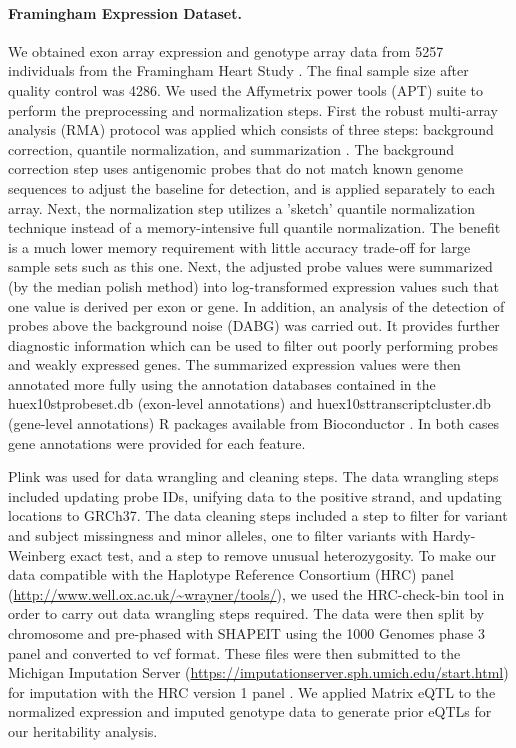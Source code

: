 \documentclass[10pt,letterpaper]{article}
\begin{document}
\paragraph*{Framingham Expression Dataset.}\label{framingham-dataset}

We obtained exon array expression and genotype array data from 5257 individuals from the Framingham Heart Study \cite{Zhang_2015}. The final sample size after quality control was 4286. We used the Affymetrix power tools (APT) suite to perform the preprocessing and normalization steps. First the robust multi-array analysis (RMA) protocol was applied which consists of three steps: background correction, quantile normalization, and summarization \cite{irizarry2003summaries}. The background correction step uses antigenomic probes that do not match known genome sequences to adjust the baseline for detection, and is applied separately to each array. Next, the normalization step utilizes a 'sketch' quantile normalization technique instead of a memory-intensive full quantile normalization. The benefit is a much lower memory requirement with little accuracy trade-off for large sample sets such as this one. Next, the adjusted probe values were summarized (by the median polish method) into log-transformed expression values such that one value is derived per exon or gene. In addition, an analysis of the detection of probes above the background noise (DABG) was carried out. It provides further diagnostic information which can be used to filter out poorly performing probes and weakly expressed genes.  The summarized expression values were then annotated more fully using the annotation databases contained in the huex10stprobeset.db (exon-level annotations) and huex10sttranscriptcluster.db (gene-level annotations) R packages available from Bioconductor \cite{MacDonald_1,MacDonald_2}. In both cases gene annotations were provided for each feature. 

Plink \cite{chang2015second} was used for data wrangling and cleaning steps. The data wrangling steps included updating probe IDs, unifying data to the positive strand, and updating locations to GRCh37. The data cleaning steps included a step to filter for variant and subject missingness and minor alleles, one to filter variants with Hardy-Weinberg exact test, and a step to remove unusual heterozygosity. To make our data compatible with the Haplotype Reference Consortium (HRC) panel (\url{http://www.well.ox.ac.uk/~wrayner/tools/}), we used the HRC-check-bin tool in order to carry out data wrangling steps required. The data were then split by chromosome and pre-phased with SHAPEIT \cite{delaneau2012linear} using the 1000 Genomes phase 3 panel and converted to vcf format. These files were then submitted to the Michigan Imputation Server (\url{https://imputationserver.sph.umich.edu/start.html}) \cite{Howie_2012,Fuchsberger_2014} for imputation with the HRC version 1 panel \cite{mccarthy2015reference}.  We applied Matrix eQTL \cite{shabalin2012matrix} to the normalized expression and imputed genotype data to generate prior eQTLs for our heritability analysis.
\end{document}
